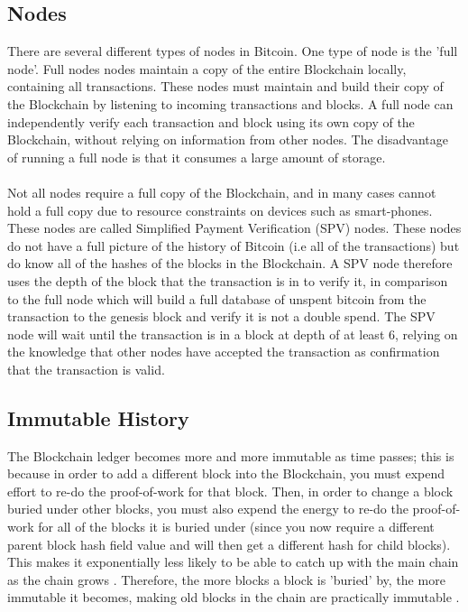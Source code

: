 \subsection{Nodes}\label{background-nodes}
There are several different types of nodes in Bitcoin. One type of node is the 'full node'. Full nodes nodes maintain a copy of the entire Blockchain locally, containing all transactions. These nodes must maintain and build their copy of the Blockchain by listening to incoming transactions and blocks. A full node can independently verify each transaction and block using its own copy of the Blockchain, without relying on information from other nodes. The disadvantage of running a full node is that it consumes a large amount of storage. 
\\\\
Not all nodes require a full copy of the Blockchain, and in many cases cannot hold a full copy due to resource constraints on devices such as smart-phones. These nodes are called Simplified Payment Verification (SPV)\cite{RefWorks:doc:5c39e80ae4b0854ae611b047} nodes. These nodes do not have a full picture of the history of Bitcoin (i.e all of the transactions) but do know all of the hashes of the blocks in the Blockchain. A SPV node therefore uses the depth of the block that the transaction is in to verify it, in comparison to the full node which will build a full database of unspent bitcoin from the transaction to the genesis block and verify it is not a double spend. The SPV node will wait until the transaction is in a block at depth of at least 6, relying on the knowledge that other nodes have accepted the transaction as confirmation that the transaction is valid. 

\subsection{Immutable History}
The Blockchain ledger becomes more and more immutable as time passes; this is because in order to add a different block into the Blockchain, you must expend effort to re-do the proof-of-work for that block. Then, in order to change a block buried under other blocks, you must also expend the energy to re-do the proof-of-work for all of the blocks it is buried under (since you now require a different parent block hash field value and will then get a different hash for child blocks). This makes it exponentially less likely to be able to catch up with the main chain as the chain grows \cite{RefWorks:doc:5c3b547fe4b0613d0cda0434}. Therefore, the more blocks a block is 'buried' by, the more immutable it becomes, making old blocks in the chain are practically immutable \cite{RefWorks:doc:5c39e80ae4b0854ae611b047}. 




